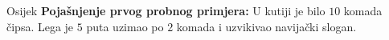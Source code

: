 \begin{statement}[
  problempoints=20,
  timelimit=1 sekunda,
  memorylimit=512 MiB,
]{Osijek}
\textbf{Pojašnjenje prvog probnog primjera:}
U kutiji je bilo $10$ komada čipsa. Lega je $5$ puta uzimao po $2$ komada i
uzvikivao navijački slogan.

\end{statement}

